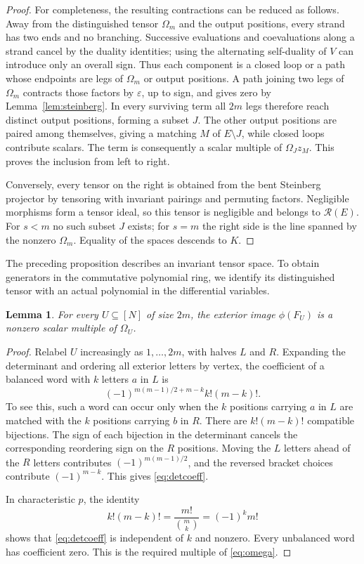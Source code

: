 \documentclass[11pt]{article}
\newtheorem{lemma}[theorem]{Lemma}
\theoremstyle{definition}
\theoremstyle{remark}
\numberwithin{equation}{section}
\newcommand{\kk}{K}
\newcommand{\eps}{\varepsilon}
\begin{document}
\begin{proof}
For completeness, the resulting contractions can be reduced as follows.
Away from the distinguished tensor $\Omega_m$ and the output positions,
every strand has two ends and no branching. Successive evaluations and
coevaluations along a strand cancel by the duality identities; using
the alternating self-duality of $V$ can introduce only an overall sign.
Thus each component is a closed loop or a path whose endpoints are
legs of $\Omega_m$ or output positions. A path joining two legs of
$\Omega_m$ contracts those factors by $\eps$, up to sign, and gives
zero by Lemma~\ref{lem:steinberg}. In every surviving term all $2m$
legs therefore reach distinct output positions, forming a subset $J$.
The other output positions are paired among themselves, giving a
matching $M$ of $E\setminus J$, while closed loops contribute scalars.
The term is consequently a scalar multiple of $\Omega_Jz_M$.
This proves the inclusion from left to right.

Conversely, every tensor on the right is obtained from the bent
Steinberg projector by tensoring with invariant pairings and permuting
factors. Negligible morphisms form a tensor ideal, so this tensor is
negligible and belongs to $\mathcal R(E)$. For $s<m$ no such subset $J$
exists; for $s=m$ the right side is the line spanned by the nonzero
$\Omega_m$. Equality of the spaces descends to $\kk$.
\end{proof}

The preceding proposition describes an invariant tensor space. To obtain
generators in the commutative polynomial ring, we identify its distinguished
tensor with an actual polynomial in the differential variables.

\begin{lemma}\label{lem:detomega}
For every $U\subseteq[N]$ of size $2m$, the exterior image $\phi(F_U)$
is a nonzero scalar multiple of $\Omega_U$.
\end{lemma}

\begin{proof}
Relabel $U$ increasingly as $1,\ldots,2m$, with halves $L$ and $R$.
Expanding the determinant and ordering all exterior letters by vertex,
the coefficient of a balanced word with $k$ letters $a$ in $L$ is
\begin{equation}\label{eq:detcoeff}
 (-1)^{m(m-1)/2+m-k}k!(m-k)!.
\end{equation}
To see this, such a word can occur only when the $k$ positions carrying
$a$ in $L$ are matched with the $k$ positions carrying $b$ in $R$.
There are $k!(m-k)!$ compatible bijections. The sign of each bijection
in the determinant cancels the corresponding reordering sign on the
$R$ positions. Moving the $L$ letters ahead of the $R$ letters contributes
$(-1)^{m(m-1)/2}$, and the reversed bracket choices contribute
$(-1)^{m-k}$. This gives \eqref{eq:detcoeff}.

In characteristic $p$, the identity
\[
 k!(m-k)!=\frac{m!}{\binom{m}{k}}=(-1)^k m!
\]
shows that \eqref{eq:detcoeff} is independent of $k$ and nonzero.
Every unbalanced word has coefficient zero. This is the required
multiple of \eqref{eq:omega}.
\end{proof}
\end{document}
